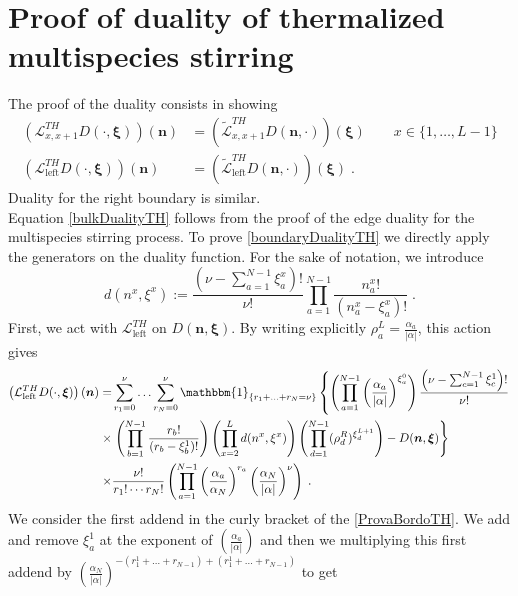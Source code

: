 \documentclass[10pt]{article}
\numberwithin{equation}{section}
\numberwithin{equation}{subsection}
\newcommand{\dt}{\;.}
\begin{document}
\section{Proof of duality of thermalized multispecies stirring}\label{appendix-dualityThermalized}
The proof of the duality consists in showing
\begin{align}
	\left(\mathcal{L}_{x,x+1}^{TH}D(\cdot,\bm{\xi})\right)(\bm{n})&=\left(\widetilde{\mathcal{L}}_{x,x+1}^{TH}D(\bm{n},\cdot)\right)(\bm{\xi})\qquad x\in \{1,\ldots,L-1\}\label{bulkDualityTH}\\
	\left(\mathcal{L}_{\text{left}}^{TH}D(\cdot,\bm{\xi})\right)(\bm{n})&=\left(\widetilde{\mathcal{L}}_{\text{left}}^{TH}D(\bm{n},\cdot)\right)(\bm{\xi})\dt\label{boundaryDualityTH}
\end{align}
Duality for the right boundary is similar. \\
Equation \eqref{bulkDualityTH} follows from the proof of the edge duality for the multispecies stirring process. To prove \eqref{boundaryDualityTH} we directly apply the generators on the duality function. For the sake of notation, we introduce 
%
\begin{equation}
	d(n^{x},\xi^{x}):=\frac{(\nu-\sum_{a=1}^{N-1}\xi_{a}^{x})!}{\nu!}\prod_{a=1}^{N-1}\frac{n_{a}^{x}!}{(n_{a}^{x}-\xi_{a}^{x})!}\dt
\end{equation}
First, we act with $\mathcal{L}_{\text{left}}^{TH}$ on $D(\bm{n},\bm{\xi})$. By writing explicitly $\rho_{a}^{L}=\frac{\alpha_{a}}{|\alpha|}$, this action gives
\begin{align}\label{ProvaBordoTH}
	\left(\mathcal{L}_{\text{left}}^{TH}D(\cdot,\bm{\xi})\right)(\bm{n})=\nonumber&\sum_{r_{1}=0}^{\nu}\ldots\sum_{r_{N}=0}^{\nu}\mathbbm{1}_{\{r_{1}+\ldots+r_{N}=\nu\}}\left\{\left(\prod_{a=1}^{N-1}\left(\frac{\alpha_{a}}{|\alpha|}\right)^{\xi_{a}^{0}}\right)\frac{\left(\nu-\sum_{c=1}^{N-1}\xi_{c}^{1}\right)!}{\nu!}\right.
	\\
	\times &\nonumber
	\left.\left(\prod_{b=1}^{N-1}\frac{r_{b}!}{(r_{b}-\xi^{1}_{b})!}\right)\left(\prod_{x=2}^{L}d(n^{x},\xi^{x})\right)\left(\prod_{d=1}^{N-1}(\rho_{d}^{R})^{\xi_{d}^{L+1}}\right)-D(\bm{n},\bm{\xi})\right\}
	\\\times &
	\frac{\nu!}{r_{1}!\cdots r_{N}!}\left(\prod_{a=1}^{N-1}\left(\frac{\alpha_{a}}{\alpha_{N}}\right)^{r_{a}}\left(\frac{\alpha_{N}}{|\alpha|}\right)^{\nu}\right)\dt
\end{align}
We consider the first addend in the curly bracket of the \eqref{ProvaBordoTH}. We add and remove $\xi_{a}^{1}$ at the exponent of $\left(\frac{\alpha_{a}}{|\alpha|}\right)$ and then we multiplying this first addend by $\left(\frac{\alpha_{N}}{|\alpha|}\right)^{-(r_{1}^{1}+\ldots+r_{N-1})+(r_{1}^{1}+\ldots+r_{N-1})}$ to get
\end{document}
